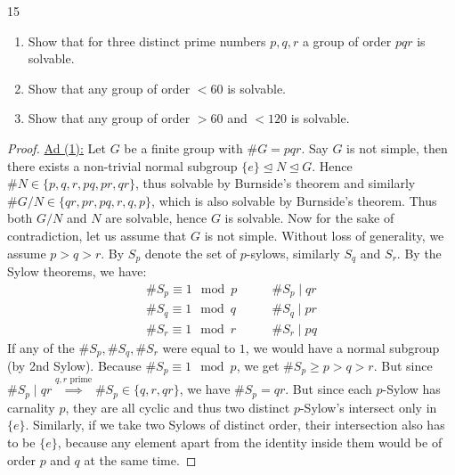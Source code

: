 \documentclass[twoside = false,	%
		headsepline,		%
		parskip = true,
		]{scrbook}						%
\begin{document}
    \begin{exercise}{}{15}
        \begin{enumerate}
            \item Show that for three distinct prime numbers $p,q,r$ a group of order $pqr$ is solvable.
            \item Show that any group of order $<60$ is solvable.
            \item Show that any group of order $>60$ and $<120$ is solvable. 
        \end{enumerate}
    \end{exercise}
    
   \begin{proof}
    \underline{Ad (1):}
        Let $G$ be a finite group with $\#G = p q r$. Say $G$ is not simple, then there exists a non-trivial normal subgroup $\{e\} \trianglelefteq N \trianglelefteq G$. Hence $\#N \in \{p,q,r,pq,pr,qr\}$, thus solvable by Burnside's theorem and similarly $\# G/N \in \{qr,pr,pq,r,q,p\}$, which is also solvable by Burnside's theorem. Thus both $G/N$ and $N$ are solvable, hence $G$ is solvable.
        Now for the sake of contradiction, let us assume that $G$ is not simple. Without loss of generality, we assume $p > q > r$. By $S_p$ denote the set of $p$-sylows, similarly $S_q$ and $S_r$. By the Sylow theorems, we have:
        \begin{equation*}
        \begin{split}
            \#S_p \equiv 1 \mod p &\qquad \#S_p \mid qr \\
            \#S_q \equiv 1 \mod q &\qquad \#S_q \mid pr \\
            \#S_r \equiv 1 \mod r &\qquad \#S_r \mid pq
        \end{split}
        \end{equation*}
        If any of the $\#S_p,\#S_q,\#S_r$ were equal to $1$, we would have a normal subgroup (by 2nd Sylow). Because $\#S_p \equiv 1 \mod p$, we get $\#S_p \geq p > q > r$. But since $\#S_p \mid qr \overset{q,r
        \text{ prime}}{\implies} \#S_p \in \{q,r,qr\}$, we have $\#S_p = qr$. But since each $p$-Sylow has carnality $p$, they are all cyclic and thus two distinct $p$-Sylow's intersect only in $\{e\}$. Similarly, if we take two Sylows of distinct order, their intersection also has to be $\{e\}$, because any element apart from the identity inside them would be of order $p$ and $q$ at the same time.


\end{proof}
\end{document}

